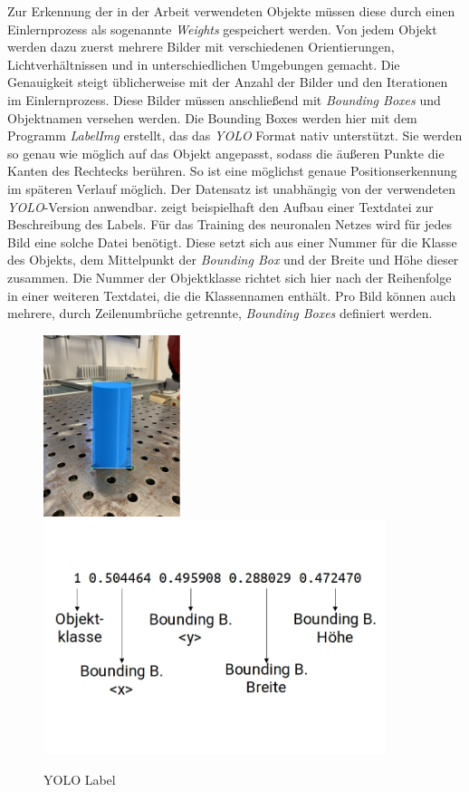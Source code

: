 Zur Erkennung der in der Arbeit verwendeten Objekte müssen diese durch einen Einlernprozess als sogenannte \textit{Weights} gespeichert werden. Von jedem Objekt werden dazu zuerst mehrere Bilder mit verschiedenen Orientierungen, Lichtverhältnissen und in unterschiedlichen Umgebungen gemacht. Die Genauigkeit steigt üblicherweise mit der Anzahl der Bilder und den Iterationen im Einlernprozess. Diese Bilder müssen anschließend mit \textit{Bounding Boxes} und Objektnamen versehen werden. Die Bounding Boxes werden hier mit dem Programm \textit{LabelImg} \cite{tzutalin_labelimg_2015} erstellt, das das \textit{\ac{YOLO}} Format nativ unterstützt. Sie werden so genau wie möglich auf das Objekt angepasst, sodass die äußeren Punkte die Kanten des Rechtecks berühren. So ist eine möglichst genaue Positionserkennung im späteren Verlauf möglich. Der Datensatz ist unabhängig von der verwendeten \textit{\ac{YOLO}}-Version anwendbar.  zeigt beispielhaft den Aufbau einer Textdatei zur Beschreibung des Labels. Für das Training des neuronalen Netzes wird für jedes Bild eine solche Datei benötigt. Diese setzt sich aus einer Nummer für die Klasse des Objekts, dem Mittelpunkt der \textit{Bounding Box} und der Breite und Höhe dieser zusammen. Die Nummer der Objektklasse richtet sich hier nach der Reihenfolge in einer weiteren Textdatei, die die Klassennamen enthält. Pro Bild können auch mehrere, durch Zeilenumbrüche getrennte, \textit{Bounding Boxes} definiert werden.

\begin{figure}[ht]
    \centering
    \includegraphics[width=4cm]{Bilder/labelimg.jpg}
    \includegraphics[width=10cm]{Bilder/boundingbox_struktur.jpg}
    \caption{YOLO Label}
    \label{fig:labelimg}
\end{figure}

